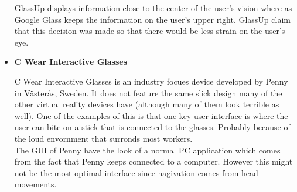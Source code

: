\begin{itemize}
GlassUp displays information close to the center of the user's vision where as Google Glass keeps the information on the user's upper right. GlassUp claim that this decision was made so that there would be less strain on the user's eye.

\item \textbf{C Wear Interactive Glasses}\cite{penny}

C Wear Interactive Glasses is an industry focues device developed by Penny in V{\"a}ster{\aa}s, Sweden. It does not feature the same slick design many of the other virtual reality devices have (although many of them look terrible as well). One of the examples of this is that one key user interface is where the user can bite on a stick that is connected to the glasses. Probably because of the loud envornment that surronds most workers.\\

The GUI of Penny have the look of a normal PC application which comes from the fact that Penny keeps connected to a computer. However this might not be the most optimal interface since nagivation comes from head movements.
\end{itemize}


